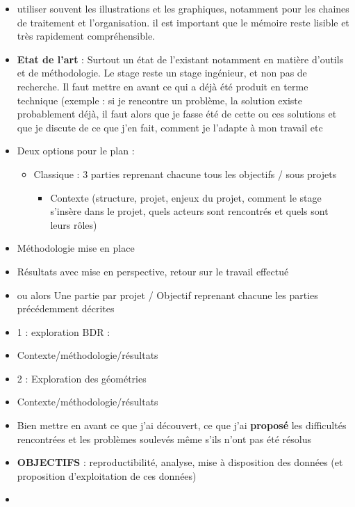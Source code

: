 \documentclass[
  a4paper,
]{scrbook}
\providecommand{\tightlist}{%
  \setlength{\itemsep}{0pt}\setlength{\parskip}{0pt}}\usepackage{longtable,booktabs,array}
\begin{document}
\begin{itemize}
\item
  utiliser souvent les illustrations et les graphiques, notamment pour
  les chaines de traitement et l'organisation. il est important que le
  mémoire reste lisible et très rapidement compréhensible.
\item
  \textbf{Etat de l'art} : Surtout un état de l'existant notamment en
  matière d'outils et de méthodologie. Le stage reste un stage
  ingénieur, et non pas de recherche. Il faut mettre en avant ce qui a
  déjà été produit en terme technique (exemple : si je rencontre un
  problème, la solution existe probablement déjà, il faut alors que je
  fasse été de cette ou ces solutions et que je discute de ce que j'en
  fait, comment je l'adapte à mon travail etc
\item
  Deux options pour le plan :

  \begin{itemize}
  \item
    Classique : 3 parties reprenant chacune tous les objectifs / sous
    projets

    \begin{itemize}
    \tightlist
    \item
      Contexte (structure, projet, enjeux du projet, comment le stage
      s'insère dans le projet, quels acteurs sont rencontrés et quels
      sont leurs rôles)
    \end{itemize}
  \end{itemize}
\item
  Méthodologie mise en place
\item
  Résultats avec mise en perspective, retour sur le travail effectué
\item
  ou alors Une partie par projet / Objectif reprenant chacune les
  parties précédemment décrites
\item
  1 : exploration BDR :
\item
  Contexte/méthodologie/résultats
\item
  2 : Exploration des géométries
\item
  Contexte/méthodologie/résultats
\item
  Bien mettre en avant ce que j'ai découvert, ce que j'ai
  \textbf{proposé} les difficultés rencontrées et les problèmes soulevés
  même s'ils n'ont pas été résolus
\item
  \textbf{OBJECTIFS} : reproductibilité, analyse, mise à disposition des
  données (et proposition d'exploitation de ces données)
\item
\end{itemize}
\end{document}
